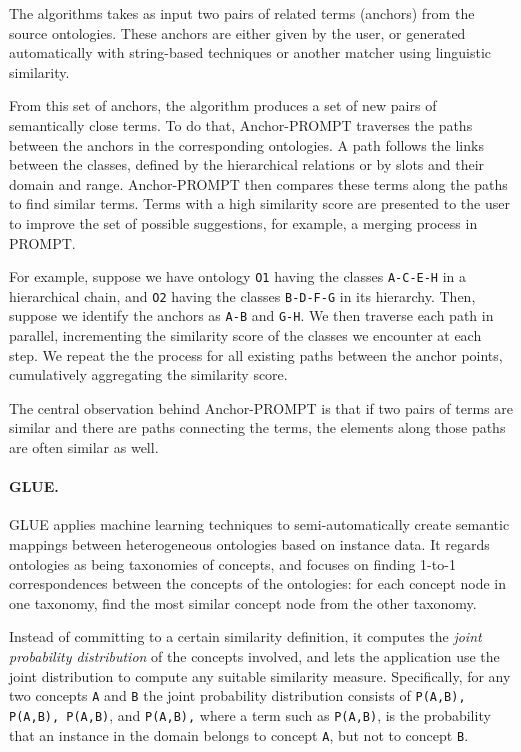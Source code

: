 The algorithms takes as input two pairs of related terms (anchors) from
the source ontologies. These anchors are either given by the user, or
generated automatically with string-based techniques or another matcher
using linguistic similarity. 

From this set of anchors, the algorithm produces a set of new pairs of
semantically close terms. To do that, Anchor-PROMPT traverses the paths
between the anchors in the corresponding ontologies. A path follows the
links between the classes, defined by the hierarchical relations or by
slots and their domain and range. Anchor-PROMPT then compares these
terms along the paths to find similar terms. Terms with a high
similarity score are presented to the user to improve the set of
possible suggestions, for example, a merging process in PROMPT. 

For example, suppose we have ontology \texttt{O1} having
the classes \texttt{A-C-E-H} in a hierarchical chain, and
\texttt{O2} having the classes
\texttt{B-D-F-G} in its hierarchy. Then, suppose we
identify the anchors as \texttt{A-B} and
\texttt{G-H}. We then traverse each path in parallel,
incrementing the similarity score of the classes we encounter at each
step. We repeat the the process for all existing paths between the
anchor points, cumulatively aggregating the similarity score. 

The central observation behind Anchor-PROMPT is that if two pairs of
terms are similar and there are paths connecting the terms, the
elements along those paths are often similar as well. 

\paragraph{GLUE.}
GLUE \cite{doan2004ontology_matching} applies machine learning techniques to
semi-automatically create semantic mappings between heterogeneous
ontologies based on instance data. It regards ontologies as being
taxonomies of concepts, and focuses on finding 1-to-1 correspondences
between the concepts of the ontologies: for each concept node in one
taxonomy, find the most similar concept node from the other taxonomy. 

Instead of committing to a certain similarity definition, it computes
the \textit{joint probability distribution} of the concepts involved,
and lets the application use the joint distribution to compute any
suitable similarity measure. Specifically, for any two concepts
\texttt{A} and \texttt{B} the joint
probability distribution consists of \texttt{P(A,B),
P(A,{\textlnot}B), P({\textlnot}A,{\textlnot}B)}, and
\texttt{P({\textlnot}A,B),} where a term such as
\texttt{P(A,{\textlnot}B)}, is the probability that an
instance in the domain belongs to concept \texttt{A}, but
not to concept \texttt{B}. 

